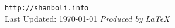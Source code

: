 \vfill
\begin{figure}[h]
\hspace{1.43in}
\end{figure}
\begin{narrow}{0.15in}{1.5in}
\begin{center}
\href{http://shanboli.info}{\tt http://shanboli.info}\\
\vspace{0.15in}
Last Updated: \today
\vspace{0.15in}
\textit{Produced by \LaTeX}
\end{center}
\end{narrow}
